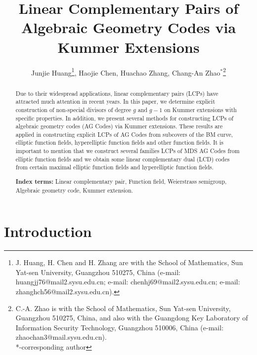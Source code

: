 \documentclass[journal,12pt,onecolumn]{IEEEtran}
\begin{document}
\title{Linear Complementary Pairs of Algebraic Geometry Codes via Kummer Extensions}
\author{Junjie Huang\thanks{J. Huang, H. Chen and H. Zhang are with the School of Mathematics, Sun Yat-sen University, Guangzhou 510275, China (e-mail: huangjj76@mail2.sysu.edu.cn; e-mail: chenhj69@mail2.sysu.edu.cn; e-mail: zhanghch56@mail2.sysu.edu.cn).}, Haojie Chen, Huachao Zhang,
Chang-An Zhao$^*$\thanks{C.-A. Zhao is with the School of Mathematics, Sun Yat-sen University, Guangzhou 510275, China, and also with the Guangdong Key Laboratory of Information Security Technology, Guangzhou 510006, China (e-mail: zhaochan3@mail.sysu.edu.cn).\\
*-corresponding author}}

\maketitle


\begin{abstract}


Due to their widespread applications, linear complementary pairs (LCPs) have attracted much attention in recent years. In this paper, we determine explicit construction of non-special divisors of degree $g$ and $g-1$ on Kummer extensions with specific properties. In addition, we present several methods for constructing LCPs of algebraic geometry codes (AG Codes) via Kummer extensions. These results are applied in constructing explicit LCPs of AG Codes from subcovers of the BM curve, elliptic function fields, hyperelliptic function fields and other function fields. It is important to mention that we construct several families LCPs of MDS AG Codes from elliptic function fields and we obtain some linear complementary dual (LCD) codes from certain maximal elliptic function fields and hyperelliptic function fields. 



{\bf Index terms:} Linear complementary pair, Function field, Weierstrass semigroup, Algebraic geometry code, Kummer extension.
\end{abstract}

\section{Introduction}
\end{document}
